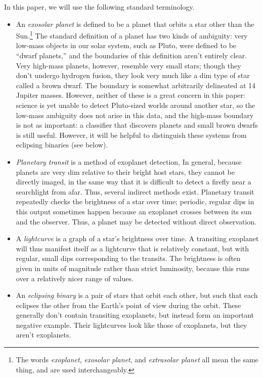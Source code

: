\documentclass{amsart}
\begin{document}
In this paper, we will use the following standard terminology.
\begin{itemize}
	\item An \emph{exosolar planet} is defined to be a planet that orbits a star other than the Sun.\footnote{The words \emph{exoplanet}, \emph{exosolar planet}, and \emph{extrasolar planet} all mean the same thing, and are used interchangeably.} The standard definition of a planet has two kinds of ambiguity: very low-mass objects in our solar system, such as Pluto, were defined to be ``dwarf planets,'' and the boundaries of this definition aren't entirely clear. Very high-mass planets, however, resemble very small stars; though they don't undergo hydrogen fusion, they look very much like a dim type of star called a brown dwarf. The boundary is somewhat arbitrarily delineated at 14 Jupiter masses. However, neither of these is a great concern in this paper: science is yet unable to detect Pluto-sized worlds around another star, so the low-mass ambiguity does not arise in this data, and the high-mass boundary is not as important: a classifier that discovers planets and small brown dwarfs is still useful. However, it will be helpful to distinguish these systems from eclipsing binaries (see below).
	\item \emph{Planetary transit} is a method of exoplanet detection, In general, because planets are very dim relative to their bright host stars, they cannot be directly imaged, in the same way that it is difficult to detect a firefly near a searchlight from afar. Thus, several indirect methods exist. Planetary transit repeatedly checks the brightness of a star over time; periodic, regular dips in this output sometimes happen because an exoplanet crosses between its sun and the observer. Thus, a planet may be detected without direct observation.
	\item A \emph{lightcurve} is a graph of a star's brightness over time. A transiting exoplanet will thus manifest itself as a lightcurve that is relatively constant, but with regular, small dips corresponding to the transits.%
	 The brightness is often given in units of magnitude rather than strict luminosity, because this runs over a relatively nicer range of values.
	\item An \emph{eclipsing binary} is a pair of stars that orbit each other, but such that each eclipses the other from the Earth's point of view during the orbit. These generally don't contain transiting exoplanets, but instead form an important negative example. Their lightcurves look like those of exoplanets, but they aren't exoplanets.
\end{itemize}
\end{document}
